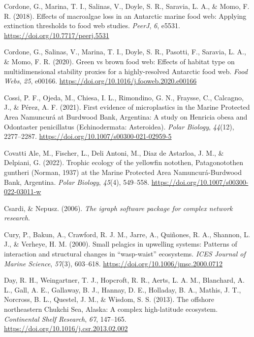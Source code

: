 \documentclass[preprint, 3p,
authoryear]{elsarticle} %
\newlength{\cslhangindent}
\newlength{\cslentryspacingunit} %
\newenvironment{CSLReferences}[2] %
 {%
  \setlength{\parindent}{0pt}
  \ifodd #1
  \let\oldpar\par
  \def\par{\hangindent=\cslhangindent\oldpar}
  \fi
  \setlength{\parskip}{#2\cslentryspacingunit}
 }%
 {}
\begin{document}
\begin{CSLReferences}{1}{0}
\leavevmode{}%
Cordone, G., Marina, T. I., Salinas, V., Doyle, S. R., Saravia, L. A.,
\& Momo, F. R. (2018). Effects of macroalgae loss in an {Antarctic}
marine food web: Applying extinction thresholds to food web studies.
\emph{PeerJ}, \emph{6}, e5531. \url{https://doi.org/10.7717/peerj.5531}

\leavevmode{}%
Cordone, G., Salinas, V., Marina, T. I., Doyle, S. R., Pasotti, F.,
Saravia, L. A., \& Momo, F. R. (2020). Green vs brown food web:
{Effects} of habitat type on multidimensional stability proxies for a
highly-resolved {Antarctic} food web. \emph{Food Webs}, \emph{25},
e00166. \url{https://doi.org/10.1016/j.fooweb.2020.e00166}

\leavevmode{}%
Cossi, P. F., Ojeda, M., Chiesa, I. L., Rimondino, G. N., Fraysse, C.,
Calcagno, J., \& Pérez, A. F. (2021). First evidence of microplastics in
the {Marine Protected Area Namuncurá} at {Burdwood Bank}, {Argentina}: A
study on {Henricia} obesa and {Odontaster} penicillatus
({Echinodermata}: {Asteroidea}). \emph{Polar Biology}, \emph{44}(12),
2277--2287. \url{https://doi.org/10.1007/s00300-021-02959-5}

\leavevmode{}%
Covatti Ale, M., Fischer, L., Deli Antoni, M., Diaz de Astarloa, J. M.,
\& Delpiani, G. (2022). Trophic ecology of the yellowfin notothen,
{Patagonotothen} guntheri ({Norman}, 1937) at the {Marine Protected Area
Namuncurá-Burdwood Bank}, {Argentina}. \emph{Polar Biology},
\emph{45}(4), 549--558. \url{https://doi.org/10.1007/s00300-022-03011-w}

\leavevmode{}%
Csardi, \& Nepusz. (2006). \emph{The igraph software package for complex
network research}.

\leavevmode{}%
Cury, P., Bakun, A., Crawford, R. J. M., Jarre, A., Quiñones, R. A.,
Shannon, L. J., \& Verheye, H. M. (2000). Small pelagics in upwelling
systems: Patterns of interaction and structural changes in
{``wasp-waist''} ecosystems. \emph{ICES Journal of Marine Science},
\emph{57}(3), 603--618. \url{https://doi.org/10.1006/jmsc.2000.0712}

\leavevmode{}%
Day, R. H., Weingartner, T. J., Hopcroft, R. R., Aerts, L. A. M.,
Blanchard, A. L., Gall, A. E., Gallaway, B. J., Hannay, D. E., Holladay,
B. A., Mathis, J. T., Norcross, B. L., Questel, J. M., \& Wisdom, S. S.
(2013). The offshore northeastern {Chukchi Sea}, {Alaska}: {A} complex
high-latitude ecosystem. \emph{Continental Shelf Research}, \emph{67},
147--165. \url{https://doi.org/10.1016/j.csr.2013.02.002}


\end{CSLReferences}
\end{document}
